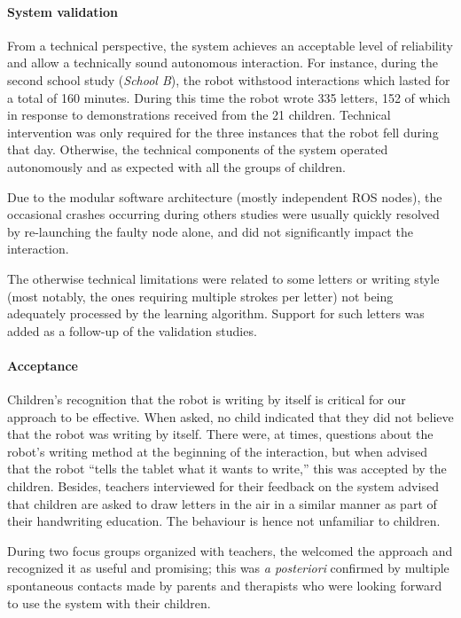 \documentclass{article}
\begin{document}
\paragraph{System validation}

From a technical perspective, the system achieves an acceptable level of
reliability and allow a technically sound autonomous interaction. For instance,
during the second school study (\textit{School B}), the robot withstood
interactions which lasted for a total of 160 minutes.  During this time the
robot wrote 335 letters, 152 of which in response to demonstrations received
from the 21 children. Technical intervention was only required for the three
instances that the robot fell during that day.  Otherwise, the technical
components of the system operated autonomously and as expected with all the
groups of children.

Due to the modular software architecture (mostly independent ROS nodes), the
occasional crashes occurring during others studies were usually quickly resolved
by re-launching the faulty node alone, and did not significantly impact the
interaction.

The otherwise technical limitations were related to some letters or writing
style (most notably, the ones requiring multiple strokes per letter) not being
adequately processed by the learning algorithm. Support for such letters was
added as a follow-up of the validation studies.

\paragraph{Acceptance}

Children's recognition that the robot is writing by itself is critical for our
approach to be effective. When asked, no child indicated that they did not
believe that the robot was writing by itself. There were, at times, questions
about the robot's writing method at the beginning of the interaction, but when
advised that the robot ``tells the tablet what it wants to write,'' this was
accepted by the children.  Besides, teachers interviewed for their feedback on
the system advised that children are asked to draw letters in the air in a
similar manner as part of their handwriting education. The behaviour is hence
not unfamiliar to children.

During two focus groups organized with teachers, the welcomed the approach and
recognized it as useful and promising; this was \textit{a posteriori} confirmed
by multiple spontaneous contacts made by parents and therapists who were looking
forward to use the system with their children.
\end{document}
